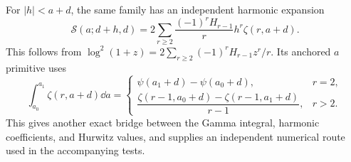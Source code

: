 For $|h|<a+d$, the same family has an independent harmonic expansion
\begin{equation}\label{hqj:eq:S-harmonic}
\mathscr S(a;d+h,d)=
2\sum_{r\ge2}\frac{(-1)^rH_{r-1}}r h^r\zeta(r,a+d).
\end{equation}
This follows from
$\log^2(1+z)=2\sum_{r\ge2}(-1)^rH_{r-1}z^r/r$.
Its anchored $a$ primitive uses
\[
\int_{a_0}^{a_1}\zeta(r,a+d)\dd a
=\begin{cases}
\psi(a_1+d)-\psi(a_0+d),&r=2,\\
\dfrac{\zeta(r-1,a_0+d)-\zeta(r-1,a_1+d)}{r-1},&r>2.
\end{cases}
\]
This gives another exact bridge between the Gamma integral,
harmonic coefficients, and Hurwitz values, and supplies an independent
numerical route used in the accompanying tests.
